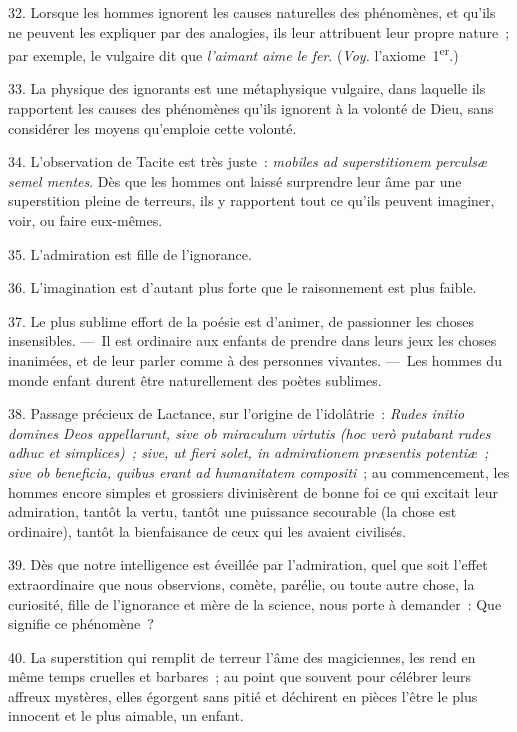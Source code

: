 \documentclass[french,twoside]{book} %
\begin{document}
32. Lorsque les hommes ignorent les causes naturelles  des phénomènes, et qu’ils ne peuvent les expliquer par des analogies, ils leur attribuent leur propre nature ; par exemple, le vulgaire dit que {\itshape l’aimant aime le fer}. ({\itshape Voy.} l’axiome 1\textsuperscript{er}.)\par
33. La physique des ignorants est une métaphysique vulgaire, dans laquelle ils rapportent les causes des phénomènes qu’ils ignorent à la volonté de Dieu, sans considérer les moyens qu’emploie cette volonté.\par
34. L’observation de Tacite est très juste : \emph{{\itshape mobiles ad superstitionem perculsæ semel mentes}}. Dès que les hommes ont laissé surprendre leur âme par une superstition pleine de terreurs, ils y rapportent tout ce qu’ils peuvent imaginer, voir, ou faire eux-mêmes.\par
35. L’admiration est fille de l’ignorance.\par
36. L’imagination est d’autant plus forte que le raisonnement est plus faible.\par
37. Le plus sublime effort de la poésie est d’animer, de passionner les choses insensibles. — Il est ordinaire aux enfants de prendre dans leurs jeux les choses inanimées, et de leur parler comme à des personnes vivantes. — Les hommes du monde enfant durent être naturellement des poètes sublimes.\par
38. Passage précieux de Lactance, sur l’origine  de l’idolâtrie : \emph{{\itshape Rudes initio domines Deos appellarunt, sive ob miraculum virtutis (hoc verò putabant rudes adhuc et simplices) ; sive, ut fieri solet, in admirationem præsentis potentiæ ; sive ob beneficia, quibus erant ad humanitatem compositi}} ; au commencement, les hommes encore simples et grossiers divinisèrent de bonne foi ce qui excitait leur admiration, tantôt la vertu, tantôt une puissance secourable (la chose est ordinaire), tantôt la bienfaisance de ceux qui les avaient civilisés.\par
39. Dès que notre intelligence est éveillée par l’admiration, quel que soit l’effet extraordinaire que nous observions, comète, parélie, ou toute autre chose, la curiosité, fille de l’ignorance et mère de la science, nous porte à demander : Que signifie ce phénomène ?\par
40. La superstition qui remplit de terreur l’âme des magiciennes, les rend en même temps cruelles et barbares ; au point que souvent pour célébrer leurs affreux mystères, elles égorgent sans pitié et déchirent en pièces l’être le plus innocent et le plus aimable, un enfant.\par
\end{document}
